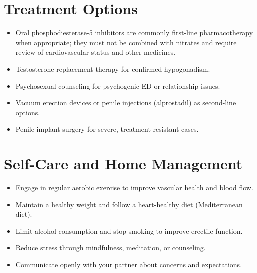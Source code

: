 \section*{Treatment Options}
\begin{itemize}
  \item Oral phosphodiesterase-5 inhibitors are commonly first-line pharmacotherapy when appropriate; they must not be combined with nitrates and require review of cardiovascular status and other medicines.
  \item Testosterone replacement therapy for confirmed hypogonadism.
  \item Psychosexual counseling for psychogenic ED or relationship issues.
  \item Vacuum erection devices or penile injections (alprostadil) as second-line options.
  \item Penile implant surgery for severe, treatment-resistant cases.
\end{itemize}


\section*{Self-Care and Home Management}
\begin{itemize}
  \item Engage in regular aerobic exercise to improve vascular health and blood flow.
  \item Maintain a healthy weight and follow a heart-healthy diet (Mediterranean diet).
  \item Limit alcohol consumption and stop smoking to improve erectile function.
  \item Reduce stress through mindfulness, meditation, or counseling.
  \item Communicate openly with your partner about concerns and expectations.
\end{itemize}


